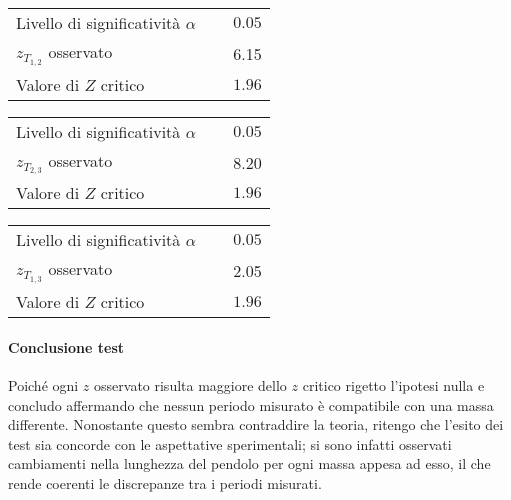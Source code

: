 \documentclass{article}
\begin{document}
	\vspace{0.7cm}
	\begin{minipage}{0.5\textwidth}
		\begin{table}[H]
			\centering
			\begin{tabular}{lr} 
				Livello di significatività $\alpha$		&$\quad 0.05$  \\
				$z_{T_{1,2}}$ osservato 					& $\quad$ 6.15 \\
				Valore di $Z$ critico     	& $\quad 1.96$
			\end{tabular}
		\end{table}
	\end{minipage}
	\begin{minipage}{0.5\textwidth}
		\begin{table}[H]
			\centering
			\begin{tabular}{lr} 
				Livello di significatività $\alpha$		&$\quad 0.05$  \\
				$z_{T_{2,3}}$ osservato 					& $\quad$ 8.20 \\
				Valore di $Z$ critico     	& $\quad 1.96$
			\end{tabular}
		\end{table}
	\end{minipage}
	\begin{table}[H]
		\centering
		\begin{tabular}{lr} 
			Livello di significatività $\alpha$		&$\quad 0.05$  \\
			$z_{T_{1,3}}$ osservato 					& $\quad$ 2.05 \\
			Valore di $Z$ critico     	& $\quad 1.96$
		\end{tabular}
	\end{table}
	
	\paragraph{Conclusione test} Poiché ogni $z$ osservato risulta maggiore dello $z$ critico rigetto l'ipotesi nulla e concludo affermando che nessun periodo misurato è compatibile con una massa differente. Nonostante questo sembra contraddire la teoria, ritengo che l'esito dei test sia concorde con le aspettative sperimentali; si sono infatti osservati cambiamenti nella lunghezza del pendolo per ogni massa appesa ad esso, il che rende coerenti le discrepanze tra i periodi misurati.
	
	
\end{document}
